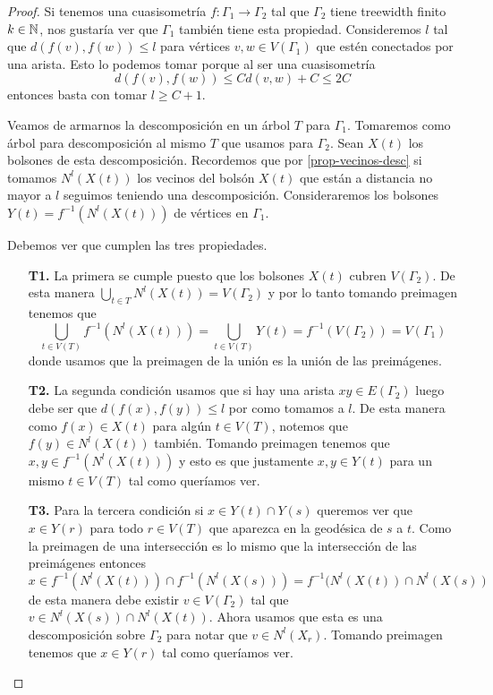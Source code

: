 \documentclass[tesis.tex]{subfiles}
\begin{document}
\begin{proof}
	Si tenemos una cuasisometría $f:\Gamma_1 \to \Gamma_2$ tal que $\Gamma_2$ tiene treewidth finito $k \in \mathbb{N}$, nos gustaría ver que $\Gamma_1$ también tiene esta propiedad.
	Consideremos $l$ tal que $d(f(v),f(w)) \le l$ para vértices $v,w \in V(\Gamma_1)$ que estén conectados por una arista.
	Esto lo podemos tomar porque al ser una cuasisometría 
	\[
	d(f(v),f(w)) \le C d(v,w) + C  \le 2C
	\]
	entonces basta con tomar $l \ge C+1$.
	
	Veamos de armarnos la descomposición en un árbol $T$ para $\Gamma_1$.	
	Tomaremos como árbol para descomposición al mismo $T$ que usamos para $\Gamma_2$.
	Sean $X(t)$ los bolsones de esta descomposición. 
	Recordemos que por \ref{prop-vecinos-desc} si tomamos $N^l(X(t))$ los vecinos del bolsón $X(t)$ que están a distancia no mayor a $l$ seguimos teniendo una descomposición.  
	Consideraremos los bolsones $Y(t) = f^{-1}(N^l(X(t)))$ de vértices en $\Gamma_1$. 
	
	Debemos ver que cumplen las tres propiedades.
	
	\begin{enumerate}
		\item[\textbf{T1.}] La primera se cumple puesto que los bolsones $X(t)$ cubren $V(\Gamma_2)$. 
		De esta manera $\bigcup_{t \in T} N^l(X(t)) = V(\Gamma_2)$ y por lo tanto tomando preimagen tenemos que
		\[
		\bigcup_{t \in V(T)} f^{-1} (N^l (X(t))) = \bigcup_{t \in V(T)} Y(t) = f^{-1} (V(\Gamma_2)) = V(\Gamma_1)
		\] 
		donde usamos que la preimagen de la unión es la unión de las preimágenes.
		\item[\textbf{T2.}] La segunda condición usamos que si hay una arista $xy \in E(\Gamma_2)$ luego debe ser que $d(f(x),f(y)) \le l$ por como tomamos a $l$.
		De esta manera como $f(x) \in X(t)$ para algún $t \in V(T)$, notemos que $f(y) \in N^l(X(t))$ también. 
		Tomando preimagen tenemos que $x,y \in f^{-1}(N^l(X(t)))$ y esto es que justamente $x,y \in Y(t)$ para un mismo $t \in V(T)$ tal como queríamos ver.		
		\item[\textbf{T3.}] Para la tercera condición si $x \in Y(t) \cap Y(s)$ queremos ver que $x \in Y(r)$ para todo $r \in V(T)$ que aparezca en la geodésica de $s$ a $t$.
		Como la preimagen de una intersección es lo mismo que la intersección de las preimágenes entonces 
		\[
		x \in f^{-1}(N^l(X(t))) \cap f^{-1}(N^l(X(s))) = f^{-1}(N^l(X(t)) \cap N^l (X(s))
		\]
		de esta manera debe existir $v \in V(\Gamma_2)$ tal que $v \in N^l(X(s)) \cap N^l(X(t))$.
		Ahora usamos que esta es una descomposición sobre $\Gamma_2$ para notar que $v \in N^l(X_r)$.
		Tomando preimagen tenemos que $x \in Y(r)$ tal como queríamos ver.
	\end{enumerate}
	

\end{proof}
\end{document}
